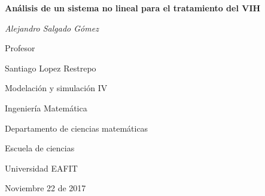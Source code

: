 \begin{titlepage}
    \centering
    \vspace{2cm}

    {\huge\bfseries Análisis de un sistema no lineal para el tratamiento del VIH\par}
    \vspace{5cm}
    {\Large\itshape Alejandro Salgado Gómez\par}
    \vfill

    Profesor\par
    {\large Santiago Lopez Restrepo\par}

    \vfill

    {\large Modelación y simulación IV \par}
    \vspace{0.2cm}
    {\large Ingeniería Matemática \par}
    \vspace{0.2cm}
    {\large Departamento de ciencias matemáticas \par}
    \vspace{0.2cm}
    {\large Escuela de ciencias \par}
    \vspace{0.2cm}
    {\large Universidad EAFIT \par}

    \vfill

    {\large Noviembre 22 de 2017}
\end{titlepage}
